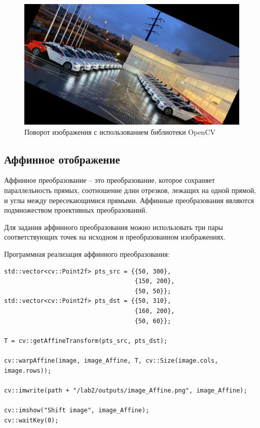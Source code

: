 \begin{figure}[ht]
    \includegraphics[width=\textwidth]{../outputs/image_rotate_point_func.png}
    \caption{Поворот изображения с использованием библиотеки OpenCV}
    \label{fig:rotate_image_cv}
\end{figure}

\subsection{Аффинное отображение} 

Аффинное преобразование -- это преобразование, которое сохраняет параллельность прямых, соотношение длин отрезков, лежащих на одной прямой, и углы между пересекающимися прямыми.
Аффинные преобразования являются подмножеством проективных преобразований. 

Для задания аффинного преобразования можно использовать три пары соответствующих точек на исходном и преобразованном изображениях.

Программная реализация аффинного преобразования:
\begin{lstlisting}[style=cpp_white, caption={Исходный код для скоса изображения}]
std::vector<cv::Point2f> pts_src = {{50, 300}, 
                                    {150, 200}, 
                                    {50, 50}};
std::vector<cv::Point2f> pts_dst = {{50, 310}, 
                                    {160, 200}, 
                                    {50, 60}};

T = cv::getAffineTransform(pts_src, pts_dst);

cv::warpAffine(image, image_Affine, T, cv::Size(image.cols, image.rows)); 

cv::imwrite(path + "/lab2/outputs/image_Affine.png", image_Affine);

cv::imshow("Shift image", image_Affine); 
cv::waitKey(0); 
\end{lstlisting}

